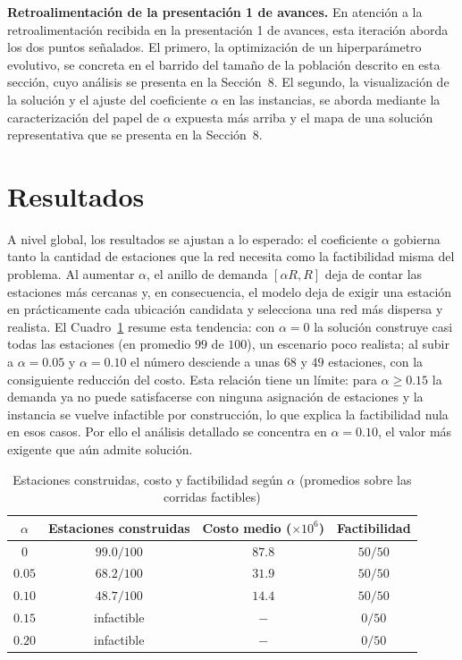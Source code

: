 \documentclass[letter, 10pt]{article}
\begin{document}
\textbf{Retroalimentación de la presentación 1 de avances.} En atención a la retroalimentación
recibida en la presentación 1 de avances, esta iteración aborda los dos puntos señalados. El primero, la optimización de un
hiperparámetro evolutivo, se concreta en el barrido del tamaño de la población descrito en esta
sección, cuyo análisis se presenta en la Sección~8. El segundo, la visualización de la solución y
el ajuste del coeficiente $\alpha$ en las instancias, se aborda mediante la caracterización del
papel de $\alpha$ expuesta más arriba y el mapa de una solución representativa que se presenta en
la Sección~8.


\section{Resultados}

A nivel global, los resultados se ajustan a lo esperado: el coeficiente $\alpha$ gobierna tanto la
cantidad de estaciones que la red necesita como la factibilidad misma del problema. Al aumentar
$\alpha$, el anillo de demanda $[\alpha R, R]$ deja de contar las estaciones más cercanas y, en
consecuencia, el modelo deja de exigir una estación en prácticamente cada ubicación candidata y
selecciona una red más dispersa y realista. El Cuadro~\ref{tab:alpha} resume esta tendencia: con
$\alpha = 0$ la solución construye casi todas las estaciones (en promedio $99$ de $100$), un
escenario poco realista; al subir a $\alpha = 0.05$ y $\alpha = 0.10$ el número desciende a unas
$68$ y $49$ estaciones, con la consiguiente reducción del costo. Esta relación tiene un límite: para
$\alpha \geq 0.15$ la demanda ya no puede satisfacerse con ninguna asignación de estaciones y la
instancia se vuelve infactible por construcción, lo que explica la factibilidad nula en esos casos.
Por ello el análisis detallado se concentra en $\alpha = 0.10$, el valor más exigente que aún admite
solución.

\begin{table}[h]
\centering
\caption{Estaciones construidas, costo y factibilidad según $\alpha$ (promedios sobre las corridas factibles)}
\label{tab:alpha}
\begin{tabular}{cccc}
\hline
$\alpha$ & Estaciones construidas & Costo medio ($\times 10^6$) & Factibilidad \\
\hline
$0$    & $99.0 / 100$ & $87.8$ & $50/50$ \\
$0.05$ & $68.2 / 100$ & $31.9$ & $50/50$ \\
$0.10$ & $48.7 / 100$ & $14.4$ & $50/50$ \\
$0.15$ & infactible   & $-$    &$0/50$  \\
$0.20$ & infactible   & $-$    &$0/50$  \\
\hline
\end{tabular}
\end{table}
\end{document}

